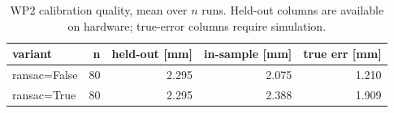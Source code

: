 \begin{table}[htbp]
  \centering
  \caption{WP2 calibration quality, mean over $n$ runs. Held-out columns are available on hardware; true-error columns require simulation.}
  \label{tab:wp2-summary}
  \begin{tabular}{lrrrr}
    \toprule
    variant & n & held-out [mm] & in-sample [mm] & true err [mm] \\
    \midrule
    ransac=False & 80 & 2.295 & 2.075 & 1.210 \\
    ransac=True & 80 & 2.295 & 2.388 & 1.909 \\
    \bottomrule
  \end{tabular}
\end{table}

